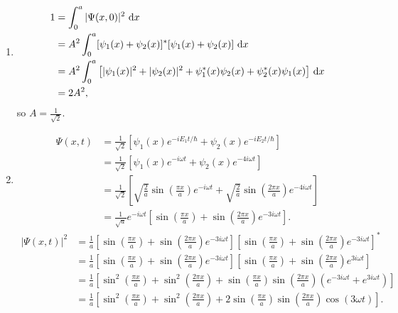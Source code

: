 \documentclass[en, oneside]{vivi}
\begin{document}
\begin{sol}
    \begin{enumerate} [label=(\alph*)]
        \item \begin{align*}
            1 &= \int_{0}^{a}|\Psi(x, 0)|^2 \dif x\\
            &= A^2 \int_{0}^{a} [\psi_1(x) + \psi_2(x)]^* [\psi_1(x) + \psi_2(x)] \dif x\\
            &= A^2 \int_{0}^{a} \left[|\psi_1(x)|^2 + |\psi_2(x)|^2 + \psi_1^*(x)\psi_2(x) + \psi_2^*(x)\psi_1(x) \right] \dif x\\
            &= 2 A^2,
        \end{align*}
        so $A = \frac{1}{\sqrt{2}}$.
        \item \begin{align*}
            \Psi(x, t) &= \frac{1}{\sqrt{2}} \left[\psi_1(x) e^{-iE_1t/\hbar} + \psi_2(x) e^{-iE_2t/\hbar}\right]\\
            &= \frac{1}{\sqrt{2}} \left[\psi_1(x) e^{-i \omega t} + \psi_2(x) e^{-4i \omega t}\right]\\
            &= \frac{1}{\sqrt{2}} \left[\sqrt{\frac{2}{a}} \sin\left(\frac{\pi x}{a}\right) e^{-i \omega t} + \sqrt{\frac{2}{a}} \sin\left(\frac{2\pi x}{a}\right) e^{-4i \omega t}\right]\\
            &= \frac{1}{\sqrt{a}} e^{-i \omega t} \left[\sin\left(\frac{\pi x}{a}\right) + \sin\left(\frac{2\pi x}{a}\right) e^{-3i \omega t}\right].
        \end{align*}
        \begin{align*}
            |\Psi(x, t)|^2 &= \frac{1}{a} \left[\sin\left(\frac{\pi x}{a}\right) + \sin\left(\frac{2\pi x}{a}\right) e^{-3i \omega t}\right] \left[\sin\left(\frac{\pi x}{a}\right) + \sin\left(\frac{2\pi x}{a}\right) e^{-3i \omega t}\right]^*\\
            &= \frac{1}{a} \left[\sin\left(\frac{\pi x}{a}\right) + \sin\left(\frac{2\pi x}{a}\right) e^{-3i \omega t}\right] \left[\sin\left(\frac{\pi x}{a}\right) + \sin\left(\frac{2\pi x}{a}\right) e^{3i \omega t}\right]\\
            &= \frac{1}{a} \left[\sin^2\left(\frac{\pi x}{a}\right) + \sin^2\left(\frac{2\pi x}{a}\right) + \sin\left(\frac{\pi x}{a}\right)\sin\left(\frac{2\pi x}{a}\right) \left(e^{-3i \omega t} + e^{3i \omega t}\right)\right]\\
            &= \frac{1}{a} \left[\sin^2\left(\frac{\pi x}{a}\right) + \sin^2\left(\frac{2\pi x}{a}\right) + 2 \sin\left(\frac{\pi x}{a}\right)\sin\left(\frac{2\pi x}{a}\right) \cos(3\omega t)\right].

\end{align*}
\end{enumerate}
\end{sol}
\end{document}
